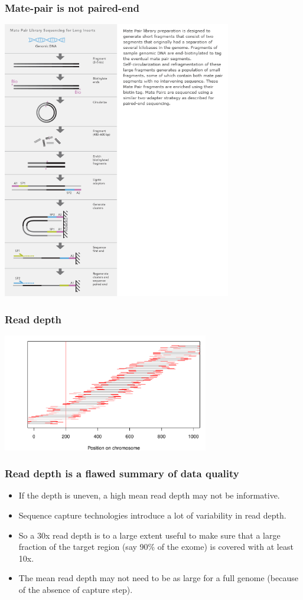 \documentclass{beamer}
\begin{document}
\begin{frame}
  \frametitle{Mate-pair is not paired-end}
  \includegraphics[width=10cm]{fig/mate_pair.jpg}
\end{frame}


\begin{frame}
  \frametitle{Read depth}
  \begin{center}
  \includegraphics[width=9cm]{fig/entropy_good.pdf}
  \end{center}
\end{frame}


\begin{frame}
  \frametitle{Read depth is a flawed summary of data quality}
  \begin{itemize}
  \item If the depth is uneven, a high mean read depth may not be informative.
  \item Sequence capture technologies introduce a lot of variability in read depth.
  \item So a 30x read depth is to a large extent useful to make sure that a large fraction of the target region (say 90\% of the exome) is covered with at least 10x.
  \item The mean read depth may not need to be as large for a full genome (because of the absence of capture step).
  \end{itemize}
\end{frame}
\end{document}
